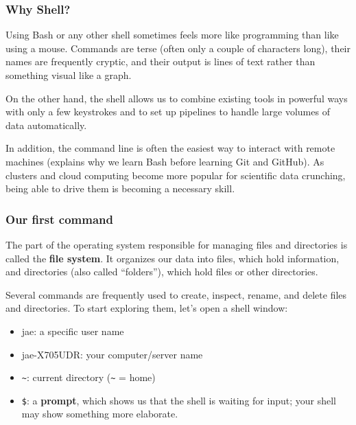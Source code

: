 \documentclass[
]{book}
\newenvironment{Shaded}{\begin{snugshade}}{\end{snugshade}}
\newcommand{\ExtensionTok}[1]{#1}
\begin{document}
\hypertarget{why-shell}{%
\subsubsection{Why Shell?}\label{why-shell}}

Using Bash or any other shell sometimes feels more like programming than like using a mouse. Commands are terse (often only a couple of characters long), their names are frequently cryptic, and their output is lines of text rather than something visual like a graph.

On the other hand, the shell allows us to combine existing tools in powerful ways with only a few keystrokes and to set up pipelines to handle large volumes of data automatically.

In addition, the command line is often the easiest way to interact with remote machines (explains why we learn Bash before learning Git and GitHub). As clusters and cloud computing become more popular for scientific data crunching, being able to drive them is becoming a necessary skill.

\hypertarget{our-first-command}{%
\subsubsection{Our first command}\label{our-first-command}}

The part of the operating system responsible for managing files and directories is called the \textbf{file system}. It organizes our data into files, which hold information, and directories (also called ``folders''), which hold files or other directories.

Several commands are frequently used to create, inspect, rename, and delete files and directories. To start exploring them, let's open a shell window:

\begin{Shaded}
\end{Shaded}

\begin{itemize}
\item
  jae: a specific user name
\item
  jae-X705UDR: your computer/server name
\item
  \texttt{\textasciitilde{}}: current directory (\texttt{\textasciitilde{}} = home)
\item
  \texttt{\$}: a \textbf{prompt}, which shows us that the shell is waiting for input; your shell may show something more elaborate.
\end{itemize}
\end{document}
